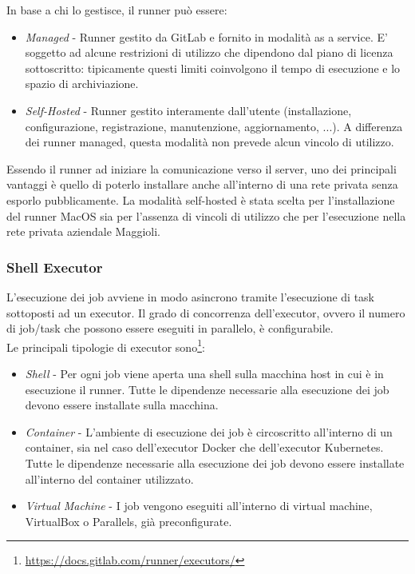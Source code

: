 In base a chi lo gestisce, il runner può essere:
\begin{itemize}
    \item \textit{Managed} - Runner gestito da GitLab e fornito in modalità as a service. E' soggetto ad alcune restrizioni di utilizzo che dipendono dal piano di licenza sottoscritto: tipicamente questi limiti coinvolgono il tempo di esecuzione e lo spazio di archiviazione.
    \item \textit{Self-Hosted} - Runner gestito interamente dall'utente (installazione, configurazione, registrazione, manutenzione, aggiornamento, ...). A differenza dei runner managed, questa modalità non prevede alcun vincolo di utilizzo.
\end{itemize}

Essendo il runner ad iniziare la comunicazione verso il server, uno dei principali vantaggi è quello di poterlo installare anche all'interno di una rete privata senza esporlo pubblicamente. La modalità self-hosted è stata scelta per l'installazione del runner MacOS sia per l'assenza di vincoli di utilizzo che per l'esecuzione nella rete privata aziendale Maggioli.

\subsubsection{Shell Executor}
L'esecuzione dei job avviene in modo asincrono tramite l'esecuzione di task sottoposti ad un executor. Il grado di concorrenza dell'executor, ovvero il numero di job/task che possono essere eseguiti in parallelo, è configurabile.\\
Le principali tipologie di executor sono\footnote{\url{https://docs.gitlab.com/runner/executors/}}:
\begin{itemize}
    \item \textit{Shell} - Per ogni job viene aperta una shell sulla macchina host in cui è in esecuzione il runner. Tutte le dipendenze necessarie alla esecuzione dei job devono essere installate sulla macchina.
    \item \textit{Container} - L'ambiente di esecuzione dei job è circoscritto all'interno di un container, sia nel caso dell'executor Docker che dell'executor Kubernetes. Tutte le dipendenze necessarie alla esecuzione dei job devono essere installate all'interno del container utilizzato.
    \item \textit{Virtual Machine} - I job vengono eseguiti all'interno di virtual machine, VirtualBox o Parallels, già preconfigurate.
\end{itemize}

